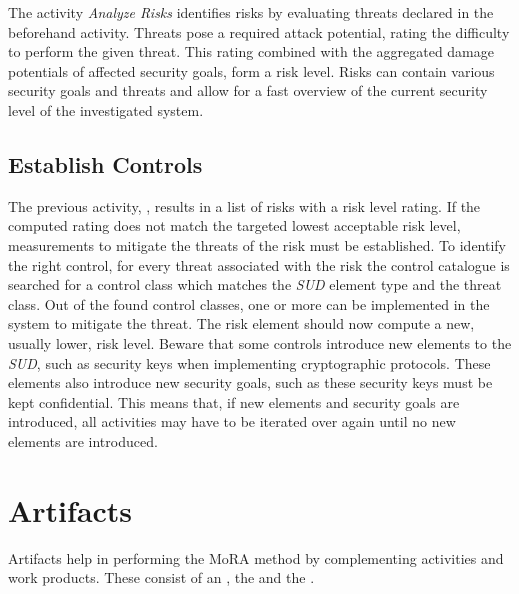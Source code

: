 The activity \textit{Analyze Risks} identifies risks by evaluating threats declared in the beforehand activity. Threats pose a required attack potential, rating the difficulty to perform the given threat. This rating combined with the aggregated damage potentials of affected security goals, form a risk level. Risks can contain various security goals and threats and allow for a fast overview of the current security level of the investigated system.


\subsection{Establish Controls}
\label{moraintrocontrols}

The previous activity, \textit{}, results in a list of risks with a risk level rating. If the computed rating does not match the targeted lowest acceptable risk level, measurements to mitigate the threats of the risk must be established. To identify the right control, for every threat associated with the risk the control catalogue is searched for a control class which matches the \textit{SUD} element type and the threat class. Out of the found control classes, one or more can be implemented in the system to mitigate the threat. The risk element should now compute a new, usually lower, risk level. Beware that some controls introduce new elements to the \textit{SUD}, such as security keys when implementing cryptographic protocols. These elements also introduce new security goals, such as these security keys must be kept confidential. This means that, if new elements and security goals are introduced, all activities may have to be iterated over again until no new elements are introduced.



\section{Artifacts}
\label{artifacts}

Artifacts help in performing the MoRA method by complementing activities and work products. These consist of an \textit{}, the \textit{} and the \textit{}.

